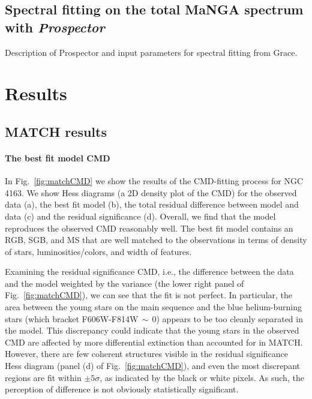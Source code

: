 \documentclass[preprint2]{aastex62}
\begin{document}
\subsection{Spectral fitting on the total MaNGA spectrum with \emph{Prospector}}\label{sec:methods:pros}

Description of Prospector and input parameters for spectral fitting from Grace.

\section{Results}\label{sec:results}

\subsection{MATCH results}\label{sec:results:match}

\paragraph{The best fit model CMD}

In Fig.~\ref{fig:matchCMD} we show the results of the CMD-fitting process for NGC 4163. We show Hess diagrams (a 2D density plot of the CMD) for the observed data (a), the best fit model (b), the total residual difference between model and data (c) and the residual significance (d). Overall, we find that the model reproduces the observed CMD reasonably well. The best fit model contains an RGB, SGB, and MS that are well matched to the observations in terms of density of stars, luminosities/colors, and width of features.

Examining the residual significance CMD, i.e., the difference between the data and the model weighted by the variance (the lower right panel of Fig.~\ref{fig:matchCMD}), we can see that the fit is not perfect. In particular, the area between the young stars on the main sequence and the blue helium-burning stars (which bracket F606W-F814W$\,{\sim}\,0$) appears to be too cleanly separated in the model. This discrepancy could indicate that the young stars in the observed CMD are affected by more differential extinction than accounted for in MATCH. However, there are few coherent structures visible in the residual significance Hess diagram (panel (d) of Fig.~\ref{fig:matchCMD}), and even the most discrepant regions are fit within $\pm 5\sigma$, as indicated by the black or white pixels. As such, the perception of difference is not obviously statistically significant.
\end{document}

